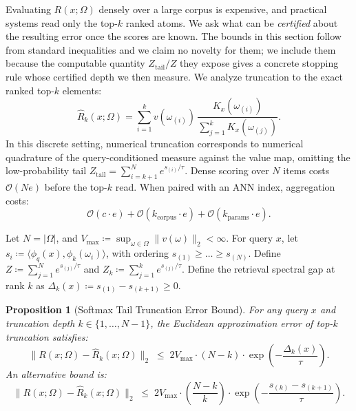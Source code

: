 \documentclass[preprint,12pt]{elsarticle}
\newtheorem{proposition}{Proposition}
\newcommand{\Om}{\Omega}
\newif\ifmarkchanges %
\newcommand{\rev}[1]{\ifmarkchanges{\color{blue}#1}\else#1\fi} %
\providecommand{\DIFaddbegin}{} %
\providecommand{\DIFaddend}{} %
\providecommand{\DIFaddincludegraphics}[2][]{{\color{blue}\fbox{\DIFOincludegraphics[#1]{#2}}}} %
\DeclareRobustCommand{\DIFaddbegin}{\DIFOaddbegin \let\includegraphics\DIFaddincludegraphics} %
\DeclareRobustCommand{\DIFaddend}{\DIFOaddend \let\includegraphics\DIFOincludegraphics} %
\begin{document}
Evaluating $R(x; \Om)$ densely over a large corpus is expensive, and practical systems read only the top-$k$ ranked atoms. We ask what can be \emph{certified} about the resulting error once the scores are known. \DIFaddbegin \rev{The bounds in this section follow from standard inequalities and we claim no novelty for them; we include them because the computable quantity $Z_{\mathrm{tail}}/Z$ they expose gives a concrete stopping rule whose certified depth we then measure.} \DIFaddend We analyze truncation to the exact ranked top-$k$ elements:
\[
  \hat{R}_k(x; \Om) = \sum_{i=1}^k v(\omega_{(i)})\, \frac{K_x(\omega_{(i)})}{\sum_{j=1}^k K_x(\omega_{(j)})}.
\]
In this discrete setting, numerical truncation corresponds to numerical quadrature of the query-conditioned measure against the value map, omitting the low-probability tail $Z_{\mathrm{tail}} = \sum_{i=k+1}^N e^{s_{(i)}/\tau}$. Dense scoring over $N$ items costs $\mathcal{O}(Ne)$ before the top-$k$ read. When paired with an ANN index, aggregation costs:
\[
  \mathcal{O}(c \cdot e) + \mathcal{O}(k_{\mathrm{corpus}} \cdot e) + \mathcal{O}(k_{\mathrm{params}} \cdot e).
\]

Let $N = |\Om|$, and $V_{\max} \coloneqq \sup_{\omega \in \Om} \|v(\omega)\|_2 < \infty$. For query $x$, let $s_i \coloneqq \langle \phi_q(x), \phi_k(\omega_i) \rangle$, with ordering $s_{(1)} \ge \dots \ge s_{(N)}$. Define $Z \coloneqq \sum_{j=1}^N e^{s_{(j)}/\tau}$ and $Z_k \coloneqq \sum_{j=1}^k e^{s_{(j)}/\tau}$. Define the retrieval spectral gap at rank $k$ as $\Delta_k(x) \coloneqq s_{(1)} - s_{(k+1)} \ge 0$.

\begin{proposition}[Softmax Tail Truncation Error Bound]
\label{thm:quadrature_bound}
For any query $x$ and truncation depth $k \in \{1, \dots, N-1\}$, the Euclidean approximation error of top-$k$ truncation satisfies:
\[
  \| R(x; \Om) - \hat{R}_k(x; \Om) \|_2 \;\le\; 2 V_{\max} \cdot (N - k) \cdot \exp\left( -\frac{\Delta_k(x)}{\tau} \right).
\]
An alternative bound is:
\[
  \| R(x; \Om) - \hat{R}_k(x; \Om) \|_2 \;\le\; 2 V_{\max} \cdot \left(\frac{N - k}{k}\right) \cdot \exp\left( -\frac{s_{(k)} - s_{(k+1)}}{\tau} \right).
\]
\end{proposition}
\end{document}
